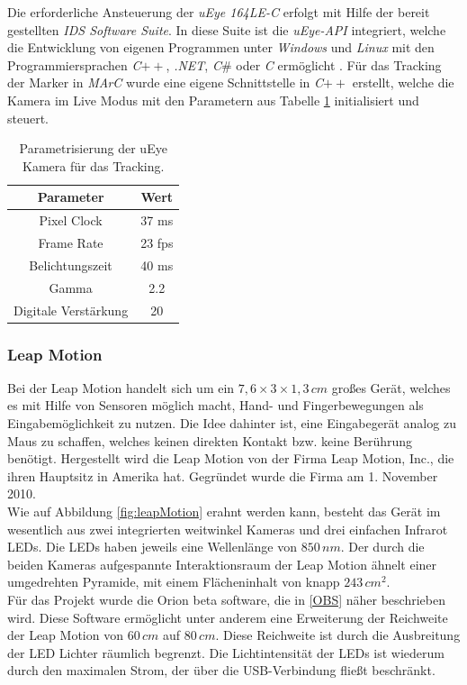 Die erforderliche Ansteuerung der \textit{uEye 164LE-C} erfolgt mit Hilfe der bereit gestellten \textit{IDS Software Suite}. In diese Suite ist die \textit{uEye-API} integriert, welche die Entwicklung von eigenen Programmen unter \textit{Windows} und \textit{Linux} mit den Programmiersprachen \textit{C}$++$, \textit{.NET}, \textit{C$\#$} oder \textit{C} ermöglicht \cite{website:IDSSuite}. Für das Tracking der Marker in \textit{MArC} wurde eine eigene Schnittstelle in \textit{C}$++$ erstellt, welche die Kamera im Live Modus mit den Parametern aus Tabelle \ref{tab:UeyeParam} initialisiert und steuert. 

\begin{table}
	\centering
	\begin{tabular}{|c|c|}
		\hline
		\Absatzbox{}
		\textbf{Parameter}& \textbf{Wert} \\
		\hline
		Pixel Clock & 37 ms \\
		\hline
		Frame Rate & 23 fps  \\
		\hline 
		Belichtungszeit & 40 ms\\
		\hline
		Gamma & 2.2 \\
		\hline
		Digitale Verstärkung & 20 \\
		\hline
	\end{tabular}
	\caption{Parametrisierung der uEye Kamera für das Tracking.}
	\label{tab:UeyeParam}
\end{table}

\subsubsection{Leap Motion}\label{sec:LeapMotion} 	
Bei der Leap Motion \cite{website:LeapMotion} handelt sich um ein $7,6\times3\times1,3\,cm$ großes Gerät, welches es mit Hilfe von Sensoren möglich macht, Hand- und Fingerbewegungen als Eingabemöglichkeit zu nutzen. Die Idee dahinter ist, eine Eingabegerät analog zu Maus zu schaffen, welches keinen direkten Kontakt bzw. keine Berührung benötigt. Hergestellt wird die Leap Motion von der Firma Leap Motion, Inc., die ihren Hauptsitz in Amerika hat. Gegründet wurde die Firma am 1. November 2010. \\
Wie auf Abbildung \ref{fig:leapMotion} erahnt werden kann, besteht das Gerät im wesentlich aus zwei integrierten weitwinkel Kameras und drei einfachen Infrarot LEDs. Die LEDs haben jeweils eine Wellenlänge von $850\,nm$. Der durch die beiden Kameras aufgespannte Interaktionsraum der Leap Motion ähnelt einer umgedrehten Pyramide, mit einem Flächeninhalt von knapp $243\,cm{^2}$. \\
Für das Projekt wurde die Orion beta software, die in \ref{OBS} näher beschrieben wird. Diese Software ermöglicht unter anderem eine Erweiterung der Reichweite der Leap Motion von $60\,cm$ auf $80\,cm$. Diese Reichweite ist durch die Ausbreitung der LED Lichter räumlich begrenzt. Die Lichtintensität der LEDs ist wiederum durch den maximalen Strom, der über die USB-Verbindung fließt beschränkt. \\

